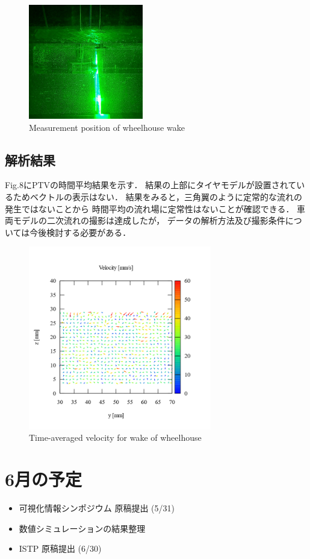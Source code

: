 \documentclass[twocolumn,a4j]{jsarticle}
\begin{document}
\begin{figure}[htbp]
  \footnotesize
  \begin{center}
    \includegraphics[width=50mm]{../images/experiment.jpg}
    \caption{Measurement position of wheelhouse wake}
  \end{center}
\end{figure}

\newpage
\subsection*{解析結果}
Fig.8にPTVの時間平均結果を示す．
結果の上部にタイヤモデルが設置されているためベクトルの表示はない．
結果をみると，三角翼のように定常的な流れの発生ではないことから
時間平均の流れ場に定常性はないことが確認できる．
車両モデルの二次流れの撮影は達成したが，
データの解析方法及び撮影条件については今後検討する必要がある．

\begin{figure}[htbp]
  \footnotesize
  \begin{center}
    \includegraphics[width=80mm]{../images/tyre.png}
    \caption{Time-averaged velocity for wake of wheelhouse}
  \end{center}
\end{figure}

\section{6月の予定}
\begin{itemize}
  \item 可視化情報シンポジウム 原稿提出 (5/31)
  \item 数値シミュレーションの結果整理
  \item ISTP 原稿提出 (6/30)
\end{itemize}
\end{document}
